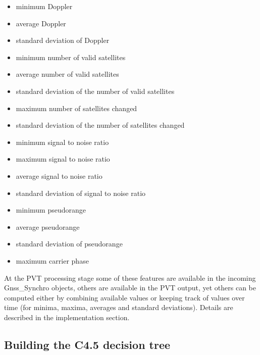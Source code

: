 \documentclass[a4paper]{usiinfbachelorproject}
\begin{document}
\begin{itemize}

\item
minimum Doppler

\item
average Doppler

\item
standard deviation of Doppler

\item
minimum number of valid satellites

\item
average number of valid satellites

\item
standard deviation of the number of valid satellites

\item
maximum number of satellites changed

\item
standard deviation of the number of satellites changed

\item
minimum signal to noise ratio

\item
maximum signal to noise ratio

\item
average signal to noise ratio

\item
standard deviation of signal to noise ratio

\item
minimum pseudorange

\item
average pseudorange

\item
standard deviation of pseudorange

\item
maximum carrier phase

\end{itemize}

At the PVT processing stage some of these features are available in the incoming Gnss\_Synchro objects,
others are available in the PVT output, yet others can be computed either by combining available values or keeping track of values over time (for minima, maxima, averages and standard deviations). Details are described in the implementation section.
		
		
	\subsection{\textbf{Building the C4.5 decision tree}}
	
\end{document}
